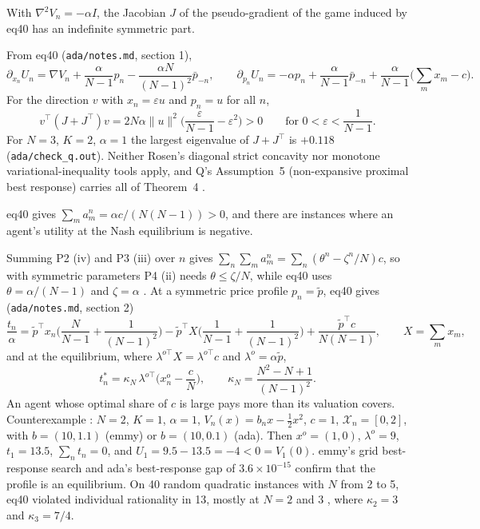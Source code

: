 \documentclass{article}
\begin{document}
\begin{claim}
With \(\nabla^2V_n=-\alpha I\), the Jacobian \(J\) of the pseudo-gradient of the game induced by eq40 has an indefinite symmetric part. 
\end{claim}

From eq40 (\texttt{ada/notes.md}, section 1),
\[
\partial_{x_n}U_n=\nabla V_n+\frac{\alpha}{N-1}p_n-\frac{\alpha N}{(N-1)^2}\bar p_{-n},\qquad
\partial_{p_n}U_n=-\alpha p_n+\frac{\alpha}{N-1}\bar p_{-n}+\frac{\alpha}{N-1}\Big(\sum_mx_m-c\Big).
\]
For the direction \(v\) with \(x_n=\varepsilon u\) and \(p_n=u\) for all \(n\),
\[
v^\top(J+J^\top)v=2N\alpha\|u\|^2\Big(\frac{\varepsilon}{N-1}-\varepsilon^2\Big)>0\qquad\text{for }0<\varepsilon<\frac1{N-1}.
\]
For \(N=3\), \(K=2\), \(\alpha=1\) the largest eigenvalue of \(J+J^\top\) is \(+0.118\) (\texttt{ada/check\_q.out}). Neither Rosen's diagonal strict concavity nor monotone variational-inequality tools apply, and Q's Assumption~5 (non-expansive proximal best response) carries all of Theorem~4 .

\begin{claim}
eq40 gives \(\sum_ma^n_m=\alpha c/(N(N-1))>0\), and there are instances where an agent's utility at the Nash equilibrium is negative. 
\end{claim}

Summing P2 (iv) and P3 (iii) over \(n\) gives \(\sum_n\sum_ma^n_m=\sum_n(\theta^n-\zeta^n/N)c\), so with symmetric parameters P4 (ii) needs \(\theta\le\zeta/N\), while eq40 uses \(\theta=\alpha/(N-1)\) and \(\zeta=\alpha\) . At a symmetric price profile \(p_n=\tilde p\), eq40 gives (\texttt{ada/notes.md}, section 2)
\[
\frac{t_n}{\alpha}=\tilde p^\top x_n\Big(\frac{N}{N-1}+\frac1{(N-1)^2}\Big)-\tilde p^\top X\Big(\frac1{N-1}+\frac1{(N-1)^2}\Big)+\frac{\tilde p^\top c}{N(N-1)},\qquad X=\sum_mx_m,
\]
and at the equilibrium, where \(\lambda^{o\top}X=\lambda^{o\top}c\) and \(\lambda^o=\alpha\tilde p\),
\[
t^*_n=\kappa_N\,\lambda^{o\top}\Big(x^o_n-\frac cN\Big),\qquad \kappa_N=\frac{N^2-N+1}{(N-1)^2}.
\]
An agent whose optimal share of \(c\) is large pays more than its valuation covers. Counterexample : \(N=2\), \(K=1\), \(\alpha=1\), \(V_n(x)=b_nx-\tfrac12x^2\), \(c=1\), \(\mathcal{X}_n=[0,2]\), with \(b=(10,1.1)\) (emmy) or \(b=(10,0.1)\) (ada). Then \(x^o=(1,0)\), \(\lambda^o=9\), \(t_1=13.5\), \(\sum_nt_n=0\), and \(U_1=9.5-13.5=-4<0=V_1(0)\). emmy's grid best-response search and ada's best-response gap of \(3.6\times10^{-15}\) confirm that the profile is an equilibrium. On 40 random quadratic instances with \(N\) from 2 to 5, eq40 violated individual rationality in 13, mostly at \(N=2\) and \(3\) , where \(\kappa_2=3\) and \(\kappa_3=7/4\).
\end{document}
